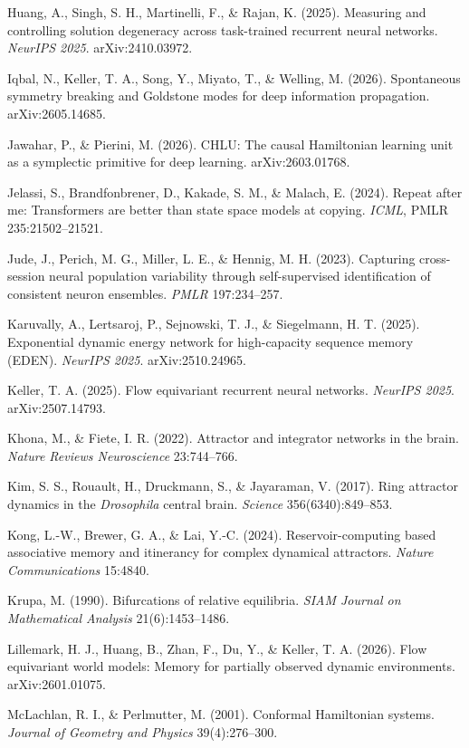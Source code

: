 \documentclass{article}
\begin{document}
Huang, A., Singh, S. H., Martinelli, F., \& Rajan, K. (2025). Measuring and controlling solution degeneracy across task-trained recurrent neural networks. \emph{NeurIPS 2025}. arXiv:2410.03972.

Iqbal, N., Keller, T. A., Song, Y., Miyato, T., \& Welling, M. (2026). Spontaneous symmetry breaking and Goldstone modes for deep information propagation. arXiv:2605.14685.

Jawahar, P., \& Pierini, M. (2026). CHLU: The causal Hamiltonian learning unit as a symplectic primitive for deep learning. arXiv:2603.01768.

Jelassi, S., Brandfonbrener, D., Kakade, S. M., \& Malach, E. (2024). Repeat after me: Transformers are better than state space models at copying. \emph{ICML}, PMLR 235:21502--21521.

Jude, J., Perich, M. G., Miller, L. E., \& Hennig, M. H. (2023). Capturing cross-session neural population variability through self-supervised identification of consistent neuron ensembles. \emph{PMLR} 197:234--257.

Karuvally, A., Lertsaroj, P., Sejnowski, T. J., \& Siegelmann, H. T. (2025). Exponential dynamic energy network for high-capacity sequence memory (EDEN). \emph{NeurIPS 2025}. arXiv:2510.24965.

Keller, T. A. (2025). Flow equivariant recurrent neural networks. \emph{NeurIPS 2025}. arXiv:2507.14793.

Khona, M., \& Fiete, I. R. (2022). Attractor and integrator networks in the brain. \emph{Nature Reviews Neuroscience} 23:744--766.

Kim, S. S., Rouault, H., Druckmann, S., \& Jayaraman, V. (2017). Ring attractor dynamics in the \emph{Drosophila} central brain. \emph{Science} 356(6340):849--853.

Kong, L.-W., Brewer, G. A., \& Lai, Y.-C. (2024). Reservoir-computing based associative memory and itinerancy for complex dynamical attractors. \emph{Nature Communications} 15:4840.

Krupa, M. (1990). Bifurcations of relative equilibria. \emph{SIAM Journal on Mathematical Analysis} 21(6):1453--1486.

Lillemark, H. J., Huang, B., Zhan, F., Du, Y., \& Keller, T. A. (2026). Flow equivariant world models: Memory for partially observed dynamic environments. arXiv:2601.01075.

McLachlan, R. I., \& Perlmutter, M. (2001). Conformal Hamiltonian systems. \emph{Journal of Geometry and Physics} 39(4):276--300.
\end{document}

